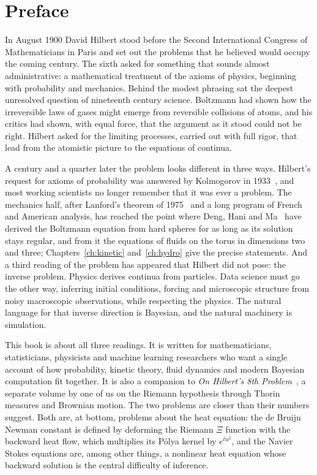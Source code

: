 \chapter*{Preface}

In August 1900 David Hilbert stood before the Second International Congress of Mathematicians in Paris and set out the problems that he believed would occupy the coming century. The sixth asked for something that sounds almost administrative: a mathematical treatment of the axioms of physics, beginning with probability and mechanics. Behind the modest phrasing sat the deepest unresolved question of nineteenth century science. Boltzmann had shown how the irreversible laws of gases might emerge from reversible collisions of atoms, and his critics had shown, with equal force, that the argument as it stood could not be right. Hilbert asked for the limiting processes, carried out with full rigor, that lead from the atomistic picture to the equations of continua.

A century and a quarter later the problem looks different in three ways. Hilbert's request for axioms of probability was answered by Kolmogorov in 1933~\cite{kolmogorov1933}, and most working scientists no longer remember that it was ever a problem. The mechanics half, after Lanford's theorem of 1975~\cite{lanford1975} and a long program of French and American analysis, has reached the point where Deng, Hani and Ma~\cite{denghanima2024,denghanima2025} have derived the Boltzmann equation from hard spheres for as long as its solution stays regular, and from it the equations of fluids on the torus in dimensions two and three; Chapters~\ref{ch:kinetic} and~\ref{ch:hydro} give the precise statements. And a third reading of the problem has appeared that Hilbert did not pose: the inverse problem. Physics derives continua from particles. Data science must go the other way, inferring initial conditions, forcing and microscopic structure from noisy macroscopic observations, while respecting the physics. The natural language for that inverse direction is Bayesian, and the natural machinery is simulation.

This book is about all three readings. It is written for mathematicians, statisticians, physicists and machine learning researchers who want a single account of how probability, kinetic theory, fluid dynamics and modern Bayesian computation fit together. It is also a companion to \emph{On Hilbert's 8th Problem}~\cite{polsonh8}, a separate volume by one of us on the Riemann hypothesis through Thorin measures and Brownian motion. The two problems are closer than their numbers suggest. Both are, at bottom, problems about the heat equation: the de Bruijn Newman constant is defined by deforming the Riemann $\Xi$ function with the backward heat flow, which multiplies its P\'olya kernel by $e^{tu^2}$, and the Navier Stokes equations are, among other things, a nonlinear heat equation whose backward solution is the central difficulty of inference.


